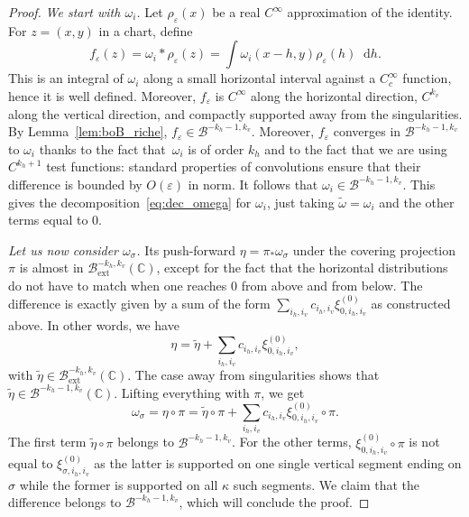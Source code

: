 \documentclass[10pt]{amsart}
\newcommand{\ext}{\mathrm{ext}}
\newcommand{\boB}{\mathcal{B}}
\newcommand{\CC}{\mathbb{C}}
\newcommand{\dd}{\mathop{}\!\mathrm{d}}
\let\epsilon\varepsilon
\theoremstyle{definition}
\numberwithin{equation}{section}
\begin{document}
\begin{proof}
\emph{We start with $\omega_i$.} Let $\rho_\epsilon(x)$ be a real $C^\infty$
approximation of the identity. For $z = (x,y)$ in a chart, define
\begin{equation*}
f_\epsilon(z) = \omega_i * \rho_\epsilon (z) = \int \omega_i(x-h, y) \rho_\epsilon(h) \dd h.
\end{equation*}
This is an integral of $\omega_i$ along a small horizontal interval against a
$C^\infty_c$ function, hence it is well defined. Moreover, $f_\epsilon$ is
$C^\infty$ along the horizontal direction, $C^{k_v}$ along the vertical
direction, and compactly supported away from the singularities. By
Lemma~\ref{lem:boB_riche}, $f_\epsilon \in \boB^{-k_h-1, k_v}$. Moreover,
$f_\epsilon$ converges in $\boB^{-k_h-1, k_v}$ to $\omega_i$ thanks to the
fact that~$\omega_i$ is of order $k_h$ and to the fact that we are using
$C^{k_h+1}$ test functions: standard properties of convolutions ensure that
their difference is bounded by $O(\epsilon)$ in norm. It follows that
$\omega_i \in \boB^{-k_h-1, k_v}$. This gives the
decomposition~\eqref{eq:dec_omega} for $\omega_i$, just taking
$\tilde\omega=\omega_i$ and the other terms equal to $0$.

\emph{Let us now consider $\omega_\sigma$.} Its push-forward $\eta =\pi_*
\omega_\sigma$ under the covering projection~$\pi$ is almost in
$\boB_{\ext}^{-k_h, k_v}(\CC)$, except for the fact that the horizontal
distributions do not have to match when one reaches $0$ from above and from
below. The difference is exactly given by a sum of the form $\sum_{i_h, i_v}
c_{i_h, i_v} \xi^{(0)}_{0, i_h, i_v}$ as constructed above. In other words,
we have
\begin{equation*}
\eta = \tilde \eta + \sum_{i_h, i_v} c_{i_h, i_v} \xi^{(0)}_{0, i_h, i_v},
\end{equation*}
with $\tilde\eta \in \boB_{\ext}^{-k_h, k_v}(\CC)$. The case away from
singularities shows that $\tilde \eta \in \boB^{-k_h-1, k_v}(\CC)$. Lifting
everything with $\pi$, we get
\begin{equation*}
\omega_\sigma = \eta \circ \pi = \tilde \eta \circ \pi + \sum_{i_h, i_v} c_{i_h, i_v} \xi^{(0)}_{0, i_h, i_v} \circ \pi.
\end{equation*}
The first term $\tilde \eta \circ \pi$ belongs to $\boB^{-k_h-1, k_v}$. For
the other terms, $\xi^{(0)}_{0, i_h, i_v} \circ \pi$ is not equal to
$\xi^{(0)}_{\sigma, i_h, i_v}$ as the latter is supported on one single
vertical segment ending on $\sigma$ while the former is supported on all
$\kappa$ such segments. We claim that the difference belongs to
$\boB^{-k_h-1, k_v}$, which will conclude the proof.


\end{proof}
\end{document}
